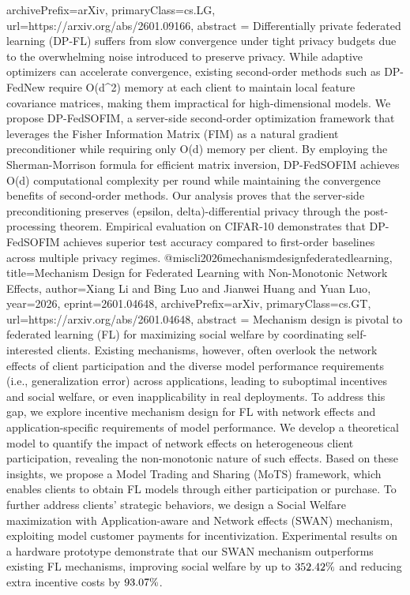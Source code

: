 {      archivePrefix={arXiv},
      primaryClass={cs.LG},
      url={https://arxiv.org/abs/2601.09166},
      abstract = {Differentially private federated learning (DP-FL) suffers from slow convergence under tight privacy budgets due to the overwhelming noise introduced to preserve privacy. While adaptive optimizers can accelerate convergence, existing second-order methods such as DP-FedNew require O(d^2) memory at each client to maintain local feature covariance matrices, making them impractical for high-dimensional models. We propose DP-FedSOFIM, a server-side second-order optimization framework that leverages the Fisher Information Matrix (FIM) as a natural gradient preconditioner while requiring only O(d) memory per client. By employing the Sherman-Morrison formula for efficient matrix inversion, DP-FedSOFIM achieves O(d) computational complexity per round while maintaining the convergence benefits of second-order methods. Our analysis proves that the server-side preconditioning preserves (epsilon, delta)-differential privacy through the post-processing theorem. Empirical evaluation on CIFAR-10 demonstrates that DP-FedSOFIM achieves superior test accuracy compared to first-order baselines across multiple privacy regimes.}
}@misc{li2026mechanismdesignfederatedlearning,
      title={Mechanism Design for Federated Learning with Non-Monotonic Network Effects}, 
      author={Xiang Li and Bing Luo and Jianwei Huang and Yuan Luo},
      year={2026},
      eprint={2601.04648},
      archivePrefix={arXiv},
      primaryClass={cs.GT},
      url={https://arxiv.org/abs/2601.04648},
      abstract = {Mechanism design is pivotal to federated learning (FL) for maximizing social welfare by coordinating self-interested clients. Existing mechanisms, however, often overlook the network effects of client participation and the diverse model performance requirements (i.e., generalization error) across applications, leading to suboptimal incentives and social welfare, or even inapplicability in real deployments. To address this gap, we explore incentive mechanism design for FL with network effects and application-specific requirements of model performance. We develop a theoretical model to quantify the impact of network effects on heterogeneous client participation, revealing the non-monotonic nature of such effects. Based on these insights, we propose a Model Trading and Sharing (MoTS) framework, which enables clients to obtain FL models through either participation or purchase. To further address clients' strategic behaviors, we design a Social Welfare maximization with Application-aware and Network effects (SWAN) mechanism, exploiting model customer payments for incentivization. Experimental results on a hardware prototype demonstrate that our SWAN mechanism outperforms existing FL mechanisms, improving social welfare by up to $352.42\\\%$ and reducing extra incentive costs by $93.07\\\%$.}
}
